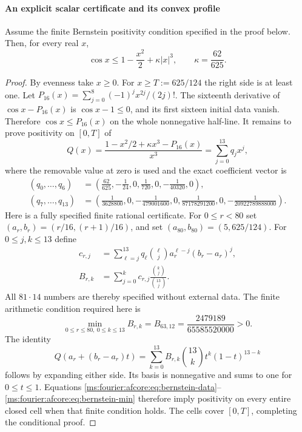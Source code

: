 \paragraph{An explicit scalar certificate and its convex profile}

\begin{lemma}\label{ms:fourier:afcore:lem:cosine}
Assume the finite Bernstein positivity condition specified in the proof
below. Then, for every real $x$,
\begin{equation}\label{ms:fourier:afcore:eq:cosine}
 \cos x\le1-\frac{x^2}{2}+\kappa|x|^3,
 \qquad \kappa=\frac{62}{625}.
\end{equation}
\end{lemma}
\begin{proof}
By evenness take $x\ge0$. For $x\ge T:=625/124$ the right side is
at least one. Let $P_{16}(x)=\sum_{j=0}^8(-1)^jx^{2j}/(2j)!$.
The sixteenth derivative of $\cos x-P_{16}(x)$ is $\cos x-1\le0$,
and its first sixteen initial data vanish. Therefore
$\cos x\le P_{16}(x)$ on the whole nonnegative half-line.
It remains to prove positivity on $[0,T]$ of
\[
 Q(x)=\frac{1-x^2/2+\kappa x^3-P_{16}(x)}{x^3}
      =\sum_{j=0}^{13}q_jx^j,
\]
where the removable value at zero is used and the exact coefficient
vector is
\begin{align*}
 (q_0,\ldots,q_6)&=
 \left(\frac{62}{625},-\frac1{24},0,\frac1{720},0,
 -\frac1{40320},0\right),\\
 (q_7,\ldots,q_{13})&=
 \left(\frac1{3628800},0,-\frac1{479001600},0,
 \frac1{87178291200},0,-\frac1{20922789888000}\right).
\end{align*}
Here is a fully specified finite rational certificate. For $0\le r<80$
set $(a_r,b_r)=(r/16,(r+1)/16)$, and set $(a_{80},b_{80})=(5,625/124)$.
For $0\le j,k\le13$ define
\begin{align}
 c_{r,j}&=\sum_{\ell=j}^{13}q_\ell\binom\ell j
               a_r^{\ell-j}(b_r-a_r)^j,\nonumber\\
 B_{r,k}&=\sum_{j=0}^k c_{r,j}\frac{\binom kj}{\binom{13}j}.
 \label{ms:fourier:afcore:eq:bernstein-data}
\end{align}
All $81\cdot14$ numbers are thereby specified without external data.
The finite arithmetic condition required here is
\begin{equation}\label{ms:fourier:afcore:eq:bernstein-min}
 \min_{0\le r\le80,\ 0\le k\le13}B_{r,k}
 =B_{63,12}=\frac{2479189}{65585520000}>0.
\end{equation}
The identity
\[
 Q(a_r+(b_r-a_r)t)
 =\sum_{k=0}^{13}B_{r,k}\binom{13}k t^k(1-t)^{13-k}
\]
follows by expanding either side. Its basis is nonnegative and sums
to one for $0\le t\le1$. Equations
\eqref{ms:fourier:afcore:eq:bernstein-data}--\eqref{ms:fourier:afcore:eq:bernstein-min}
therefore imply positivity on every entire closed cell when that finite
condition holds. The cells cover $[0,T]$, completing the conditional proof.
\end{proof}

